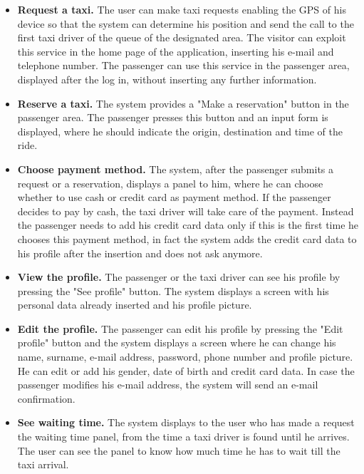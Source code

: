 \documentclass[18pt,oneside,a4paper, titlepage]{article}
\begin{document}
\begin{itemize}
			\item \textbf{Request a taxi.}
				The user can make taxi requests enabling the GPS of his device so that the system can determine his position and send the call to the first taxi driver of the queue of the designated area.
				The visitor can exploit this service in the home page of the application, inserting his e-mail and telephone number.
				The passenger can use this service in the passenger area, displayed after the log in, without inserting any further information.
				
			\item \textbf{Reserve a taxi.}
				The system provides a "Make a reservation" button in the passenger area. The passenger presses this button and an input form is displayed, where he should indicate the origin, destination and time of the ride.
				
				\newpage
			\item \textbf{Choose payment method.}
				The system, after the passenger submits a request or a reservation, displays a panel to him, where he can choose whether to use cash or credit card as payment method. If the passenger decides to pay by cash, the taxi driver will take care of the payment. Instead the passenger needs to add his credit card data only if this is the first time he chooses this payment method, in fact the system adds the credit card data to his profile after the insertion and does not ask anymore. 
				
			\item \textbf{View the profile.}
				The passenger or the taxi driver can see his profile by pressing the "See profile" button. The system displays a screen with his personal data already inserted and his profile picture.
				
			\item \textbf{Edit the profile.}
				 The passenger can edit his profile by pressing the "Edit profile" button and the system displays a screen where he can change his name, surname, e-mail address, password, phone number and profile picture. He can edit or add his gender, date of birth and credit card data. In case the passenger modifies his e-mail address, the system will send an e-mail confirmation.
				 
			\item \textbf{See waiting time.}
				The system displays to the user who has made a request the waiting time panel, from the time a taxi driver is found until he arrives. The user can see the panel to know how much time he has to wait till the taxi arrival.
				

\end{itemize}
\end{document}
